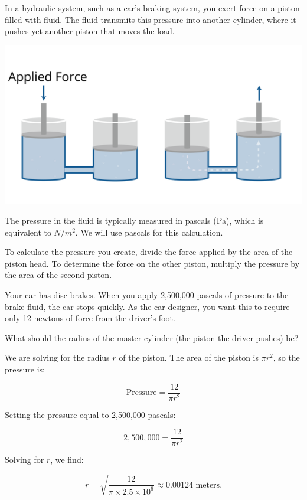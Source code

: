 In a hydraulic system, such as a car's braking system, you exert force on a piston filled with fluid. The fluid transmits this pressure into another cylinder, where it pushes yet another piston that moves the load.

\includegraphics[width=\textwidth]{hydraulicsNew.png}

The pressure in the fluid is typically measured in pascals (Pa), which is equivalent to \(N / m^2\). We will use pascals for this calculation.

To calculate the pressure you create, divide the force applied by the area of the piston head. To determine the force on the other piston, multiply the pressure by the area of the second piston.

\begin{Exercise}[title={Hydraulics}, label=hydraulics]
Your car has disc brakes. When you apply 2,500,000 pascals of pressure to the brake fluid, the car stops quickly. As the car designer, you want this to require only 12 newtons of force from the driver's foot.

What should the radius of the master cylinder (the piston the driver pushes) be?
\end{Exercise}
\begin{Answer}[ref=hydraulics]
We are solving for the radius \( r \) of the piston. The area of the piston is \( \pi r^2 \), so the pressure is:

\[
\text{Pressure} = \frac{12}{\pi r^2}
\]

Setting the pressure equal to 2,500,000 pascals:

\[
2,500,000 = \frac{12}{\pi r^2}
\]

Solving for \( r \), we find:

\[
r = \sqrt{\frac{12}{\pi \times 2.5 \times 10^6}} \approx 0.00124 \text{ meters}.
\]
\end{Answer}
